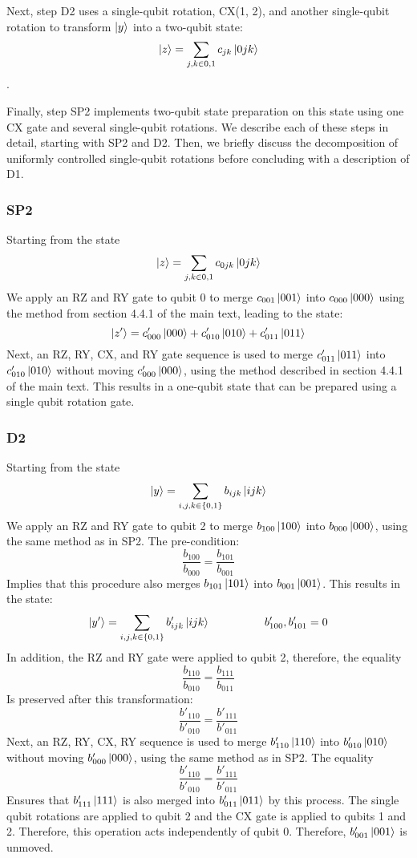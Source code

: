 \documentclass{article}
\begin{document}
Next, step D2 uses a single-qubit rotation, CX(1, 2), and another 
single-qubit rotation to transform $\mathinner{|{y}\rangle}$ into a two-qubit state:
$$\mathinner{|{z}\rangle} = \sum_{j, k \in {0, 1}}{c_{jk}\mathinner{|{0jk}\rangle}}$$.

Finally, step SP2 implements two-qubit state preparation on this state using
one CX gate and several single-qubit rotations. We describe each of these steps
in detail, starting with SP2 and D2. Then, we briefly discuss the
decomposition of uniformly controlled single-qubit rotations before concluding
with a description of D1.

\subsubsection{SP2}
Starting from the state
$$\mathinner{|{z}\rangle} = \sum_{j, k \in {0, 1}}{c_{0jk}\mathinner{|{0jk}\rangle}}$$
We apply an RZ and RY gate to qubit 0 to merge $c_{001}\mathinner{|{001}\rangle}$ into 
$c_{000}\mathinner{|{000}\rangle}$
using the method from section 4.4.1 of the main text, leading to the state:
$$\mathinner{|{z'}\rangle} = c'_{000}\mathinner{|{000}\rangle} + c'_{010}\mathinner{|{010}\rangle} + c'_{011}\mathinner{|{011}\rangle}$$
Next, an RZ, RY, CX, and RY gate sequence is used to merge $c'_{011}\mathinner{|{011}\rangle}$
into $c'_{010}\mathinner{|{010}\rangle}$ without moving $c'_{000}\mathinner{|{000}\rangle}$, using the
method described in section 4.4.1 of the main text. This results in a one-qubit
state that can be prepared using a single qubit rotation gate.

\subsubsection{D2}
Starting from the state
$$\mathinner{|{y}\rangle} = \sum_{i, j, k \in \{0, 1\}}{b_{ijk}\mathinner{|{ijk}\rangle}}$$
We apply an RZ and RY gate to qubit 2 to merge $b_{100}\mathinner{|{100}\rangle}$ into 
$b_{000}\mathinner{|{000}\rangle}$, using the same method as in SP2. The pre-condition:
$$\frac{b_{100}}{b_{000}} = \frac{b_{101}}{b_{001}}$$
Implies that this procedure also merges $b_{101}\mathinner{|{101}\rangle}$ into 
$b_{001}\mathinner{|{001}\rangle}$. This results in the state:
$$\mathinner{|{y'}\rangle} = \sum_{i, j, k \in \{0, 1\}}{b'_{ijk}\mathinner{|{ijk}\rangle}} \quad \quad \quad \quad \quad b'_{100}, b'_{101} = 0$$
In addition, the RZ and RY gate were applied to
qubit 2, therefore, the equality
$$\frac{b_{110}}{b_{010}} = \frac{b_{111}}{b_{011}}$$
Is preserved after this transformation:
$$\frac{b'_{110}}{b'_{010}} = \frac{b'_{111}}{b'_{011}}$$
Next, an RZ, RY, CX, RY sequence is used to merge $b'_{110}\mathinner{|{110}\rangle}$ into
$b'_{010}\mathinner{|{010}\rangle}$ without moving $b'_{000}\mathinner{|{000}\rangle}$, using the same method as
in SP2. The equality
$$\frac{b'_{110}}{b'_{010}} = \frac{b'_{111}}{b'_{011}}$$
Ensures that $b'_{111}\mathinner{|{111}\rangle}$ is also merged into $b'_{011}\mathinner{|{011}\rangle}$ by this
process. The single qubit rotations are applied to qubit 2 and the CX gate is
applied to qubits 1 and 2. Therefore, this operation acts independently of
qubit 0. Therefore, $b'_{001}\mathinner{|{001}\rangle}$ is unmoved.
\end{document}
